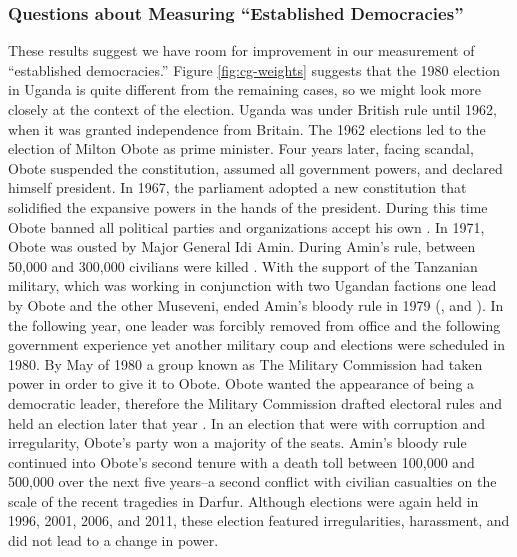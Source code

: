 \documentclass[12pt]{article}
\begin{document}
\subsubsection*{Questions about Measuring ``Established Democracies''}

These results suggest we have room for improvement in our measurement of ``established democracies.'' 
Figure \ref{fig:cg-weights} suggests that the 1980 election in Uganda is quite different from the remaining cases, so we might look more closely at the context of the election.
Uganda was under British rule until 1962, when it was granted independence from Britain. 
The 1962 elections led to the election of Milton Obote as prime minister. 
Four years later, facing scandal, Obote suspended the constitution, assumed all government powers, and declared himself president. 
In 1967, the parliament adopted a new constitution that solidified the expansive powers in the hands of the president. 
During this time Obote banned all political parties and organizations accept his own \citep[p. 99]{Kasozi1993}. 
In 1971, Obote was ousted by Major General Idi Amin. During Amin's rule, between 50,000 and 300,000 civilians were killed \citep[p. 104]{Kasozi1993}. 
With the support of the Tanzanian military, which was working in conjunction with two Ugandan factions one lead by Obote and the other Museveni, ended Amin's bloody rule in 1979 (\citealt[p. 53]{Kasfir1998}, and \citealt[pp. 124-127]{Kasozi1993}).
In the following year, one leader was forcibly removed from office and the following government experience yet another military coup and elections were scheduled in 1980. 
By May of 1980 a group known as The Military Commission had taken power in order to give it to Obote. 
Obote wanted the appearance of being a democratic leader, therefore the Military Commission drafted electoral rules and held an election later that year \citep[pp. 135-137]{Kasozi1993}.
In an election that were with corruption and irregularity, Obote's party won a majority of the seats. 
Amin's bloody rule continued into Obote's second tenure with a death toll between 100,000 and 500,000 over the next five years--a second conflict with civilian casualties on the scale of the recent tragedies in Darfur. 
Although elections were again held in 1996, 2001, 2006, and 2011, these election featured irregularities, harassment, and did not lead to a change in power.
\end{document}
